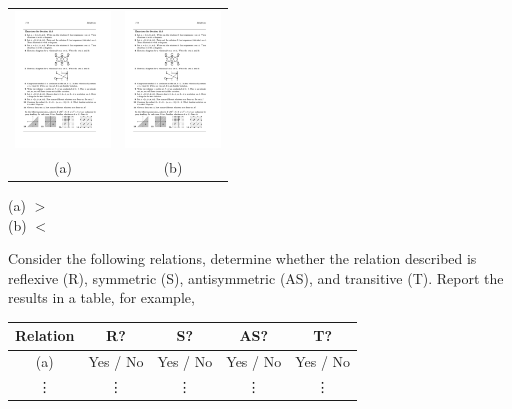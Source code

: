 \begin{questions}
\begin{tabular}{cc}
	\includegraphics[width=1in]{figs/rel1} & 
	\includegraphics[width=1in]{figs/rel3} \\
	(a) & (b) 
\end{tabular}
\ifprintanswers 
	\vspace{-10pt}
\fi 
\begin{solution}
	(a) $>$\\
	(b) $<$ 
\end{solution}




 Consider the following relations, determine whether the relation described is reflexive (R), symmetric (S), antisymmetric (AS), and transitive (T).  Report the results in a table, for example, 

\ifprintanswers
\else
\begin{tabular}{|c||c|c|c|c|}
	\hline 
		\textbf{Relation} & \textbf{R?} & \textbf{S?} & \textbf{AS?} & \textbf{T?} \\
	\hline 
		(a)  &  \hspace{0.1in}Yes / No\hspace{0.1in} & \hspace{0.1in}Yes / No\hspace{0.1in} & \hspace{0.1in}Yes / No\hspace{0.1in} &  \hspace{0.1in} Yes / No\hspace{0.1in} \\
		\vdots & \vdots & \vdots & \vdots & \vdots \\	
	\hline 
\end{tabular}
\fi 


\end{questions}
